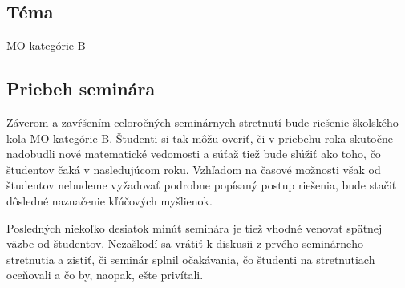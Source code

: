 
\subsection*{Téma}
MO kategórie B

\subsection{Priebeh seminára}
Záverom a zavŕšením celoročných seminárnych stretnutí bude riešenie školského kola MO kategórie B. Študenti si tak môžu overiť, či v priebehu roka skutočne nadobudli nové matematické vedomosti a súťaž tiež bude slúžiť ako  toho, čo študentov čaká v nasledujúcom roku. Vzhľadom na časové možnosti však od študentov nebudeme vyžadovať podrobne popísaný postup riešenia, bude stačiť dôsledné naznačenie kľúčových myšlienok.

Posledných niekoľko desiatok minút seminára je tiež vhodné venovať spätnej väzbe od študentov. Nezaškodí sa vrátiť k diskusii z prvého seminárneho stretnutia a zistiť, či seminár splnil očakávania, čo študenti na stretnutiach oceňovali a čo by, naopak, ešte privítali.
